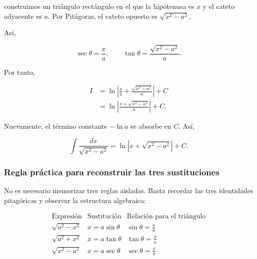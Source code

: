 construimos un triángulo rectángulo en el que la hipotenusa es $x$ y el
cateto adyacente es $a$. Por Pitágoras, el cateto opuesto es
$\sqrt{x^2-a^2}$.

\begin{center}
\end{center}

Así,

\[
\sec\theta=\frac{x}{a},
\qquad
\tan\theta=\frac{\sqrt{x^2-a^2}}{a}.
\]

Por tanto,

\begin{align*}
I
&=\ln\left|
\frac{x}{a}+\frac{\sqrt{x^2-a^2}}{a}
\right|+C\\
&=\ln\left|
\frac{x+\sqrt{x^2-a^2}}{a}
\right|+C.
\end{align*}

Nuevamente, el término constante $-\ln a$ se absorbe en $C$. Así,

\[
\boxed{
\int\frac{dx}{\sqrt{x^2-a^2}}
=\ln|x+\sqrt{x^2-a^2}|+C.}
\]

\subsubsection*{Regla práctica para reconstruir las tres sustituciones}

No es necesario memorizar tres reglas aisladas. Basta recordar las tres
identidades pitagóricas y observar la estructura algebraica:

\[
\boxed{
\begin{array}{c|c|c}
\text{Expresión} & \text{Sustitución} & \text{Relación para el triángulo}\\ \hline
\sqrt{a^2-x^2} & x=a\sin\theta & \displaystyle\sin\theta=\frac{x}{a}\\[3mm]
\sqrt{a^2+x^2} & x=a\tan\theta & \displaystyle\tan\theta=\frac{x}{a}\\[3mm]
\sqrt{x^2-a^2} & x=a\sec\theta & \displaystyle\sec\theta=\frac{x}{a}
\end{array}}
\]

